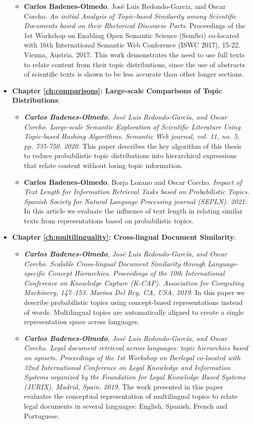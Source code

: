 \begin{itemize}
\begin{itemize}
\item \textbf{Carlos Badenes-Olmedo}, José Luis Redondo-Garcia, and Oscar Corcho. \textit{An initial Analysis of Topic-based Similarity among Scientific Documents based on their Rhetorical Discourse Parts}. Proceedings of the 1st Workshop on Enabling Open Semantic Science (SemSci) co-located with 16th International Semantic Web Conference (ISWC 2017), 15-22. Vienna, Austria. 2017. This work demonstrates the need to use full texts to relate content from their topic distributions, since the use of abstracts of scientific texts is shown to be less accurate than other longer sections. 
\end{itemize}
\item \textbf{Chapter \ref{ch:comparisons}: Large-scale Comparisons of Topic Distributions}:
\begin{itemize}
\item \textit{\textbf{Carlos Badenes-Olmedo}, José Luis Redondo-García, and Oscar Corcho. \textit{Large-scale Semantic Exploration of Scientific Literature Using Topic-based Hashing Algorithms}. Semantic Web journal, vol. 11, no. 5, pp. 735-750. 2020.} This paper describes the key algorithm of this thesis to reduce probabilistic topic distributions into hierarchical expressions that relate content without losing topic information.
\item \textbf{Carlos Badenes-Olmedo}, Borja Lozano and Oscar Corcho. \textit{Impact of Text Length for Information Retrieval Tasks based on Probabilistic Topics. Spanish Society for Natural Language Processing journal (SEPLN). 2021.} In this article we evaluate the influence of text length in relating similar texts from representations based on probabilistic topics.
\end{itemize}
\item \textbf{Chapter \ref{ch:multilinguality}: Cross-lingual Document Similarity}:
\begin{itemize}
\item \textit{\textbf{Carlos Badenes-Olmedo}, José Luis Redondo-García, and Oscar Corcho. \textit{Scalable Cross-lingual Document Similarity through Language-specific Concept Hierarchies}. Proceedings of the 10th International Conference on Knowledge Capture (K-CAP). Association for Computing Machinery, 147–153. Marina Del Rey, CA, USA. 2019.} In this paper we describe probabilistic topics using concept-based representations instead of words.  Multilingual topics are automatically aligned to create a single representation space across languages.   
\item \textit{\textbf{Carlos Badenes-Olmedo}, José Luis Redondo-García, and Oscar Corcho. \textit{Legal document retrieval across languages: topic hierarchies based on synsets}. Proceedings of the 1st Workshop on Iberlegal co-located with 32nd International Conference on Legal Knowledge and Information Systems organized by the Foundation for Legal Knowledge Based Systems (JURIX). Madrid, Spain. 2019.} The work presented in this paper evaluates the conceptual representation of multilingual topics to relate legal documents in several languages: English, Spanish, French and Portuguese.

\end{itemize}
\end{itemize}
